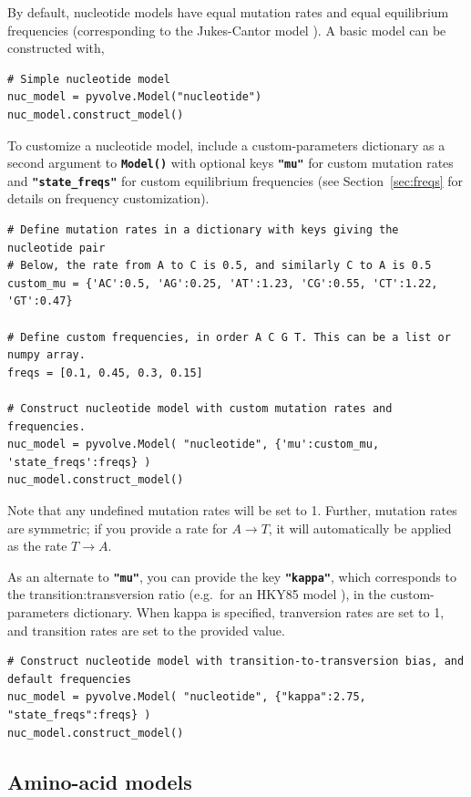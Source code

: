 \documentclass{article}
\newcommand{\code}[1]{\textbf{\texttt{\small{#1}}}}
\begin{document}
By default, nucleotide models have equal mutation rates and equal equilibrium frequencies (corresponding to the Jukes-Cantor model \citep{JC69}). A basic model can be constructed with, 
\begin{lstlisting}
# Simple nucleotide model 
nuc_model = pyvolve.Model("nucleotide")
nuc_model.construct_model()
\end{lstlisting}

To customize a nucleotide model, include a custom-parameters dictionary as a second argument to \code{Model()} with optional keys \code{"mu"} for custom mutation rates and \code{"state\_freqs"} for custom equilibrium frequencies (see Section~\ref{sec:freqs} for details on frequency customization). 
\begin{lstlisting}
# Define mutation rates in a dictionary with keys giving the nucleotide pair
# Below, the rate from A to C is 0.5, and similarly C to A is 0.5
custom_mu = {'AC':0.5, 'AG':0.25, 'AT':1.23, 'CG':0.55, 'CT':1.22, 'GT':0.47} 

# Define custom frequencies, in order A C G T. This can be a list or numpy array.
freqs = [0.1, 0.45, 0.3, 0.15]

# Construct nucleotide model with custom mutation rates and frequencies.
nuc_model = pyvolve.Model( "nucleotide", {'mu':custom_mu, 'state_freqs':freqs} )
nuc_model.construct_model()
\end{lstlisting}
Note that any undefined mutation rates will be set to 1. Further, mutation rates are symmetric; if you provide a rate for $A \rightarrow T$, it will automatically be applied as the rate $T \rightarrow A$. 

As an alternate to \code{"mu"}, you can provide the key \code{"kappa"}, which corresponds to the transition:transversion ratio (e.g.\ for an HKY85  model \citep{HKY85}), in the custom-parameters dictionary. When kappa is specified, tranversion rates are set to 1, and transition rates are set to the provided value.

\begin{lstlisting}
# Construct nucleotide model with transition-to-transversion bias, and default frequencies
nuc_model = pyvolve.Model( "nucleotide", {"kappa":2.75, "state_freqs":freqs} )
nuc_model.construct_model()
\end{lstlisting}


\subsection{Amino-acid models}\label{sec:amino_basic}
\end{document}
